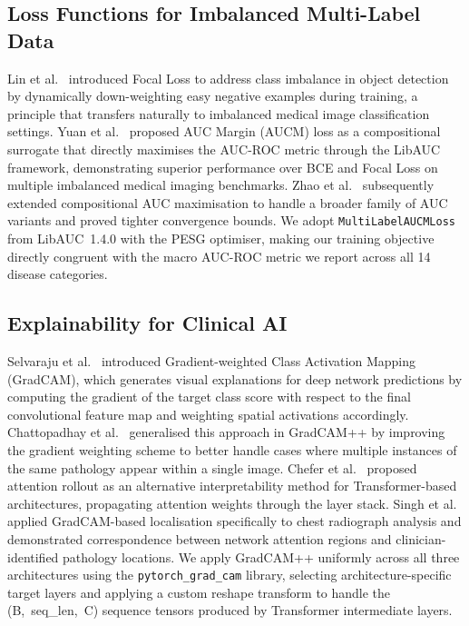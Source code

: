 \documentclass[conference]{IEEEtran}
\begin{document}
\subsection{Loss Functions for Imbalanced Multi-Label Data}

Lin et al.~\cite{lin2017} introduced Focal Loss to address class
imbalance in object detection by dynamically down-weighting easy
negative examples during training, a principle that transfers naturally
to imbalanced medical image classification settings. Yuan
et al.~\cite{yuan2021} proposed AUC Margin (AUCM) loss as a
compositional surrogate that directly maximises the AUC-ROC metric
through the LibAUC framework, demonstrating superior performance over
BCE and Focal Loss on multiple imbalanced medical imaging benchmarks.
Zhao et al.~\cite{zhao2023} subsequently extended compositional AUC
maximisation to handle a broader family of AUC variants and proved
tighter convergence bounds. We adopt \texttt{MultiLabelAUCMLoss} from
LibAUC~1.4.0 with the PESG optimiser, making our training objective
directly congruent with the macro AUC-ROC metric we report across all
14 disease categories.

\subsection{Explainability for Clinical AI}

Selvaraju et al.~\cite{selvaraju2017} introduced Gradient-weighted
Class Activation Mapping (GradCAM), which generates visual explanations
for deep network predictions by computing the gradient of the target
class score with respect to the final convolutional feature map and
weighting spatial activations accordingly. Chattopadhay
et al.~\cite{chattopadhay2018} generalised this approach in GradCAM++
by improving the gradient weighting scheme to better handle cases where
multiple instances of the same pathology appear within a single image.
Chefer et al.~\cite{chefer2021} proposed attention rollout as an
alternative interpretability method for Transformer-based architectures,
propagating attention weights through the layer stack. Singh
et al.~\cite{singh2020} applied GradCAM-based localisation specifically
to chest radiograph analysis and demonstrated correspondence between
network attention regions and clinician-identified pathology locations.
We apply GradCAM++ uniformly across all three architectures using the
\texttt{pytorch\_grad\_cam} library, selecting architecture-specific
target layers and applying a custom reshape transform to handle the
(B,~seq\_len,~C) sequence tensors produced by Transformer intermediate
layers.
\end{document}
